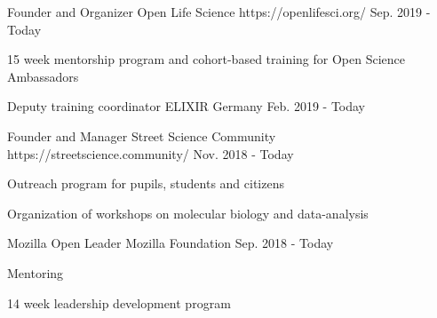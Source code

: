 

\begin{cventries}

  \cventry
    {Founder and Organizer} %
    {Open Life Science} %
    {https://openlifesci.org/} %
    {Sep. 2019 - Today} %
    {
      \begin{cvitems} %
        \item {15 week mentorship program and cohort-based training for Open Science Ambassadors}
      \end{cvitems}
    }


    \cventry
    {Deputy training coordinator} %
    {ELIXIR Germany} %
    {} %
    {Feb. 2019 - Today} %
    {}


    \cventry
    {Founder and Manager} %
    {Street Science Community} %
    {https://streetscience.community/} %
    {Nov. 2018 - Today} %
    {
      \begin{cvitems} %
        \item {Outreach program for pupils, students and citizens}
        \item {Organization of workshops on molecular biology and data-analysis}
      \end{cvitems}
    }

  \cventry
    {Mozilla Open Leader} %
    {Mozilla Foundation} %
    {} %
    {Sep. 2018 - Today} %
    {
      \begin{cvitems} %
        \item {Mentoring}
        \item {14 week leadership development program}
      \end{cvitems}
    }


\end{cventries}
